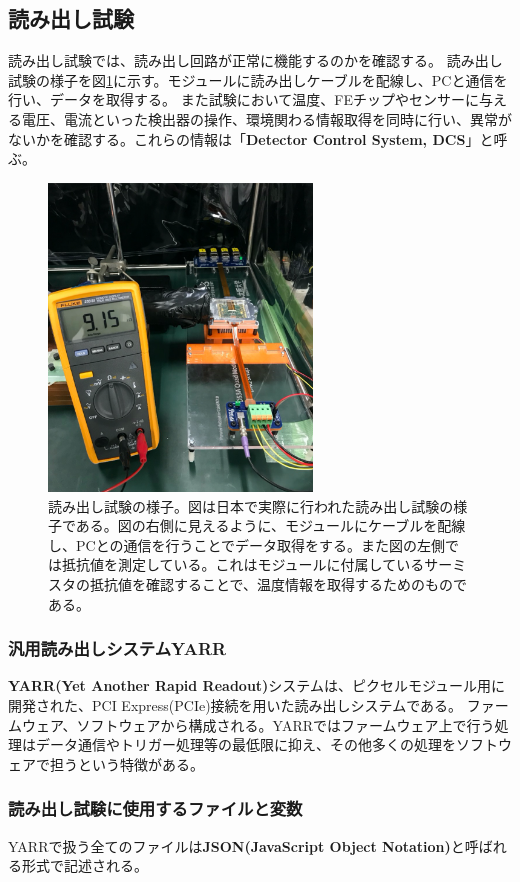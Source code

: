 \clearpage
\subsection{読み出し試験}
読み出し試験では、読み出し回路が正常に機能するのかを確認する。
読み出し試験の様子を図\ref{readout_overview}に示す。モジュールに読み出しケーブルを配線し、PCと通信を行い、データを取得する。
また試験において温度、FEチップやセンサーに与える電圧、電流といった検出器の操作、環境関わる情報取得を同時に行い、異常がないかを確認する。これらの情報は「\textbf{Detector Control System, DCS}」と呼ぶ。

\begin{figure}[bpt]\centering
\includegraphics[width=7cm]{./readout_overview.png}
\caption[読み出し試験の様子]{読み出し試験の様子\cite{3-4}。図は日本で実際に行われた読み出し試験の様子である。図の右側に見えるように、モジュールにケーブルを配線し、PCとの通信を行うことでデータ取得をする。また図の左側では抵抗値を測定している。これはモジュールに付属しているサーミスタの抵抗値を確認することで、温度情報を取得するためのものである。}
\label{readout_overview}
\end{figure}

\subsubsection{汎用読み出しシステムYARR}
\textbf{YARR(Yet Another Rapid Readout)}システム\cite{3-3}は、ピクセルモジュール用に開発された、PCI Express(PCIe)接続を用いた読み出しシステムである。
ファームウェア、ソフトウェアから構成される。YARRではファームウェア上で行う処理はデータ通信やトリガー処理等の最低限に抑え、その他多くの処理をソフトウェアで担うという特徴がある。

\subsubsection{読み出し試験に使用するファイルと変数}
YARRで扱う全てのファイルは\textbf{JSON(JavaScript Object Notation)}と呼ばれる形式で記述される。

